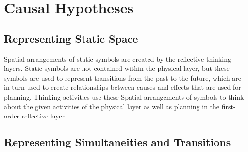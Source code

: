 \chapter{Causal Hypotheses}
\label{chapter:causal_hypotheses}

\section{Representing Static Space}

Spatial arrangements of static symbols are created by the reflective
thinking layers.  Static symbols are not contained within the physical
layer, but these symbols are used to represent transitions from the
past to the future, which are in turn used to create relationships
between causes and effects that are used for planning.  Thinking
activities use these Spatial arrangements of symbols to think about
the given activities of the physical layer as well as planning in the
first-order reflective layer.

\section{Representing Simultaneities and Transitions}

